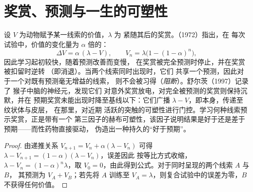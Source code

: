 \section{奖赏、预测与一生的可塑性}

\begin{proposition}[由预测误差学习]\label{prop:b3:learning-memory:rescorla}
设 $V$ 为动物赋予某一线索的价值，$\lambda$ 为
紧随其后的奖赏。（1972）指出，在
每次试验中，价值的变化量为
$\alpha$ 倍的\emph{}：
\[
\Delta V = \alpha\,(\lambda - V), \qquad
V_{n} = \lambda\bigl(1 - (1-\alpha)^{n}\bigr) ,
\]
因此学习起初较快，随着预测改善而变慢，
在奖赏被完全预测时停止，并在奖赏被扣留时逆转
（即消退）。当两个线索同时出现时，它们
共享一个预测，因此对于一个对既有预测毫无增益的线索，
则不会被习得（\emph{阻断}）。舒尔茨（1997）记录了
猴子中脑的神经元，发现它们
对意外奖赏放电，对完全被预测的奖赏则保持沉默，并在
预期奖赏未能出现时降至基线以下：它们广播
$\lambda - V$，即本身，传递至纹状体与皮层，
在那里，对近期
活跃的突触的可塑性进行门控。学习何种线索预示奖赏，正是带有一个
第三因子的赫布可塑性，该因子说明结果是好于还是差于
预期——而性药物直接驱动，
伪造出一种持久的“好于预期”。
\end{proposition}
\begin{proof}
由递推关系 $V_{n+1} = V_{n} + \alpha(\lambda - V_{n})$ 可得
$\lambda - V_{n+1} = (1-\alpha)(\lambda - V_{n})$，误差因此
按等比方式收缩，$\lambda - V_{n} = (1-\alpha)^{n}\lambda$，取 $V_{0} =
0$，由此得到公式。对于同时呈现的两个线索 $A$ 与 $B$，
其预测为 $V_{A} + V_{B}$；若先将 $A$ 训练至
$V_{A} = \lambda$，则复合试验中的误差为零，$B$
不获得任何价值。
\end{proof}

